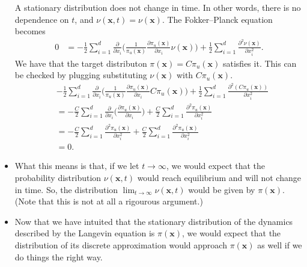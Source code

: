 \documentclass[10pt]{article}
\newcommand{\ve}[1]{\mathbf{#1}}
\begin{document}
\begin{itemize}
  A stationary distribution does not change in time. In other words, there is no dependence on $t$, and $\nu(\ve{x},t) = \nu(\ve{x})$. The Fokker--Planck equation becomes
  \begin{align*}
    0 &= - \frac{1}{2} \sum_{i=1}^d \frac{\partial}{\partial x_i} \bigg( \frac{1}{\pi_u(\ve{x})} \frac{\partial \pi_u(\ve{x})}{\partial x_i} \nu(\ve{x}) \bigg) + \frac{1}{2} \sum_{i=1}^d \frac{\partial^2 \nu(\ve{x})}{\partial x_i^2}.
  \end{align*}
  We have that the target distributon $\pi(\ve{x}) = C\pi_u(\ve{x})$ satisfies it. This can be checked by plugging substituting $\nu(\ve{x})$ with $C \pi_u(\ve{x})$.
  \begin{align*}
    & - \frac{1}{2} \sum_{i=1}^d \frac{\partial}{\partial x_i} \bigg( \frac{1}{\pi_u(\ve{x})} \frac{\partial \pi_u(\ve{x})}{\partial x_i} C \pi_u(\ve{x}) \bigg) + \frac{1}{2} \sum_{i=1}^d \frac{\partial^2 (C\pi_u(\ve{x}))}{\partial x_i^2} \\
    &= - \frac{C}{2} \sum_{i=1}^d \frac{\partial}{\partial x_i} \bigg( \frac{\partial \pi_u(\ve{x})}{\partial x_i} \bigg) + \frac{C}{2} \sum_{i=1}^d \frac{\partial^2 \pi_u(\ve{x})}{\partial x_i^2} \\
    &= - \frac{C}{2} \sum_{i=1}^d \frac{\partial^2 \pi_u(\ve{x})}{\partial x_i^2}  + \frac{C}{2} \sum_{i=1}^d \frac{\partial^2 \pi_u(\ve{x})}{\partial x_i^2} \\
    &= 0.  
  \end{align*}
  
  \item What this means is that, if we let $t \rightarrow \infty$, we would expect that the probability distribution $\nu(\ve{x},t)$ would reach equilibrium and will not change in time. So, the distribution $\lim_{t \rightarrow \infty} \nu(\ve{x},t)$ would be given by $\pi(\ve{x})$. (Note that this is not at all a rigourous argument.)
  
  \item Now that we have intuited that the stationary distribution of the dynamics described by the Langevin equation is $\pi(\ve{x})$, we would expect that the distribution of its discrete approximation would approach $\pi(\ve{x})$ as well if we do things the right way.
\end{itemize}
\end{document}
